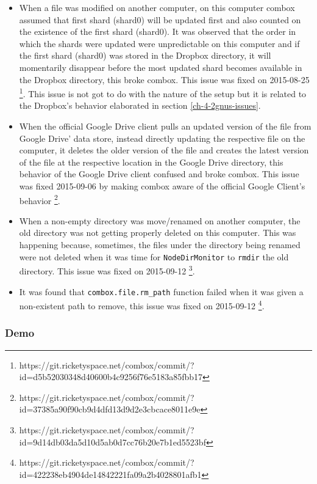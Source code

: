 \begin{itemize}
\item When a file was modified on another computer, on this computer
  combox assumed that first shard (shard0) will be updated first and
  also counted on the existence of the first shard (shard0). It was
  observed that the order in which the shards were updated were
  unpredictable on this computer and if the first shard (shard0) was
  stored in the Dropbox directory, it will momentarily disappear
  before the most updated shard becomes available in the Dropbox
  directory, this broke combox. This issue was fixed on 2015-08-25
  \footnote{https://git.ricketyspace.net/combox/commit/?id=d5b52030348d40600b4c9256f76e5183a85fbb17}. This
  issue is not got to do with the nature of the setup but it is
  related to the Dropbox's behavior elaborated in section
  \ref{ch-4-2gnus-issues}.
\item When the official Google Drive client pulls an updated version
  of the file from Google Drive' data store, instead directly updating
  the respective file on the computer, it deletes the older version of
  the file and creates the latest version of the file at the
  respective location in the Google Drive directory, this behavior of
  the Google Drive client confused and broke combox. This issue was
  fixed 2015-09-06 by making combox aware of the official Google
  Client's behavior
  \footnote{https://git.ricketyspace.net/combox/commit/?id=37385a90f90cb9d4dfd13d9d2e3cbcace8011e9e}.
\item When a non-empty directory was move/renamed on another computer,
  the old directory was not getting properly deleted on this computer.
  This was happening because, sometimes, the files under the directory
  being renamed were not deleted when it was time for
  \verb+NodeDirMonitor+ to \verb+rmdir+ the old directory. This issue
  was fixed on 2015-09-12
  \footnote{https://git.ricketyspace.net/combox/commit/?id=9d14db03da5d10d5ab0d7cc76b20e7b1ed5523bf}.
\item It was found that \verb+combox.file.rm_path+ function failed
  when it was given a non-existent path to remove, this issue was
  fixed on 2015-09-12
  \footnote{https://git.ricketyspace.net/combox/commit/?id=422238eb4904de14842221fa09a2b4028801afb1}.
\end{itemize}

\subsubsection{Demo}

